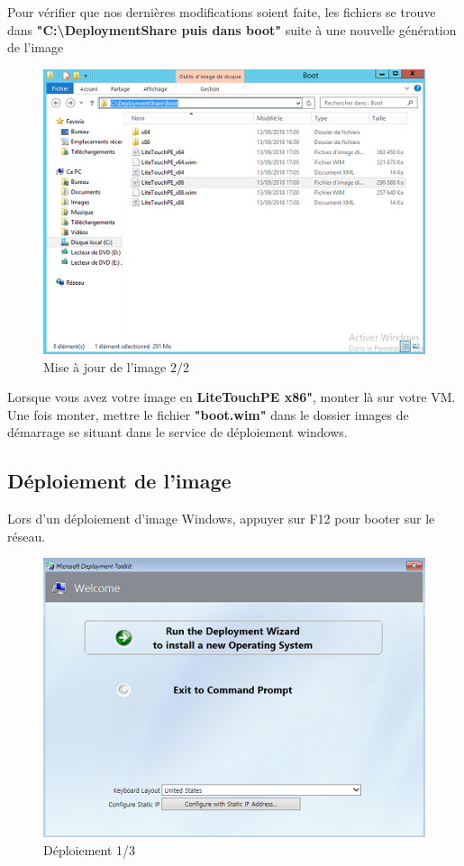\documentclass[11pt,a4paper,oneside]{article}
\begin{document}
\newpage
Pour vérifier que nos dernières modifications soient faite, les fichiers se trouve dans \textbf{"C:\textbackslash{}DeploymentShare puis dans boot"} suite à une nouvelle génération de l'image
\begin{figure}[hbtp]
\centering
\includegraphics[scale=0.7]{Pictures/MDT/MDT11.png}
\caption{\label{etiquette} Mise à jour de l'image 2/2}
\end{figure}

Lorsque vous avez votre image en \textbf{LiteTouchPE x86"}, monter là sur votre VM. Une fois monter, mettre le fichier \textbf{"boot.wim"} dans le dossier images de démarrage se situant dans le service de déploiement windows.

\newpage
\subsection{Déploiement de l'image}
Lors d'un déploiement d'image Windows, appuyer sur F12 pour booter sur le réseau.
\begin{figure}[hbtp]
\centering
\includegraphics[scale=0.7]{Pictures/Deploiement/DEP1.png}
\caption{\label{etiquette} Déploiement 1/3}
\end{figure}
\end{document}
